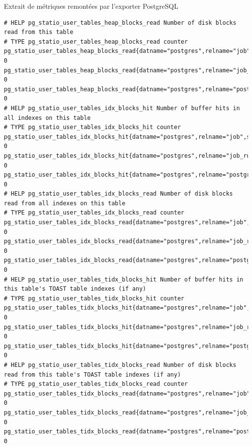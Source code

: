 \begin{frame}[fragile,shrink=5]{Extrait de métriques remontées par l'exporter PostgreSQL}

\begin{Verbatim}[commandchars=\\\{\}]
# HELP pg_statio_user_tables_heap_blocks_read Number of disk blocks read from this table
# TYPE pg_statio_user_tables_heap_blocks_read counter
pg_statio_user_tables_heap_blocks_read{datname="postgres",relname="job",schemaname="cron"} 0
pg_statio_user_tables_heap_blocks_read{datname="postgres",relname="job_run_details",schemaname="cron"} 0
pg_statio_user_tables_heap_blocks_read{datname="postgres",relname="postgres_log",schemaname="public"} 0
# HELP pg_statio_user_tables_idx_blocks_hit Number of buffer hits in all indexes on this table
# TYPE pg_statio_user_tables_idx_blocks_hit counter
pg_statio_user_tables_idx_blocks_hit{datname="postgres",relname="job",schemaname="cron"} 0
pg_statio_user_tables_idx_blocks_hit{datname="postgres",relname="job_run_details",schemaname="cron"} 0
pg_statio_user_tables_idx_blocks_hit{datname="postgres",relname="postgres_log",schemaname="public"} 0
# HELP pg_statio_user_tables_idx_blocks_read Number of disk blocks read from all indexes on this table
# TYPE pg_statio_user_tables_idx_blocks_read counter
pg_statio_user_tables_idx_blocks_read{datname="postgres",relname="job",schemaname="cron"} 0
pg_statio_user_tables_idx_blocks_read{datname="postgres",relname="job_run_details",schemaname="cron"} 0
pg_statio_user_tables_idx_blocks_read{datname="postgres",relname="postgres_log",schemaname="public"} 0
# HELP pg_statio_user_tables_tidx_blocks_hit Number of buffer hits in this table's TOAST table indexes (if any)
# TYPE pg_statio_user_tables_tidx_blocks_hit counter
pg_statio_user_tables_tidx_blocks_hit{datname="postgres",relname="job",schemaname="cron"} 0
pg_statio_user_tables_tidx_blocks_hit{datname="postgres",relname="job_run_details",schemaname="cron"} 0
pg_statio_user_tables_tidx_blocks_hit{datname="postgres",relname="postgres_log",schemaname="public"} 0
# HELP pg_statio_user_tables_tidx_blocks_read Number of disk blocks read from this table's TOAST table indexes (if any)
# TYPE pg_statio_user_tables_tidx_blocks_read counter
pg_statio_user_tables_tidx_blocks_read{datname="postgres",relname="job",schemaname="cron"} 0
pg_statio_user_tables_tidx_blocks_read{datname="postgres",relname="job_run_details",schemaname="cron"} 0
pg_statio_user_tables_tidx_blocks_read{datname="postgres",relname="postgres_log",schemaname="public"} 0
\end{Verbatim}

\end{frame}


